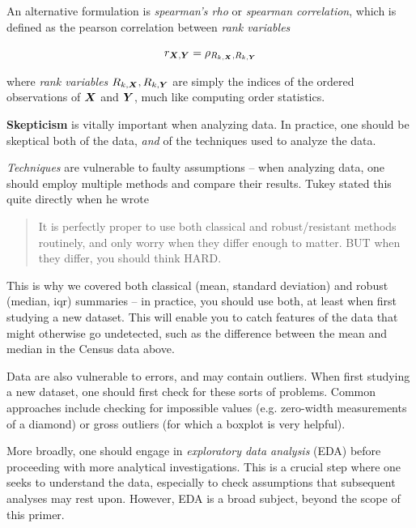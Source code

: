 \documentclass[../primer.tex]{subfiles}
\begin{document}
An alternative formulation is \emph{spearman's rho} or \emph{spearman
  correlation}, which is defined as the pearson correlation between \emph{rank
  variables}

\begin{equation}
  r_{\boldsymbol{X},\boldsymbol{Y}} = \rho_{R_{k,\boldsymbol{X}},R_{k,\boldsymbol{Y}}}
\end{equation}

\noindent where \emph{rank variables} $R_{k,\boldsymbol{X}},R_{k,\boldsymbol{Y}}$ are simply the
indices of the ordered observations of $\boldsymbol{X}$ and $\boldsymbol{Y}$, much like computing
order statistics.\cite{conover1980practical}

\textbf{Skepticism} is vitally important when analyzing data. In practice, one
should be skeptical both of the data, \emph{and} of the techniques used to
analyze the data.

\emph{Techniques} are vulnerable to faulty assumptions -- when analyzing data,
one should employ multiple methods and compare their results.
Tukey\cite{tukey1979robust} stated this quite directly when he wrote

\begin{quote}
It is perfectly proper to use both classical and robust/resistant methods
routinely, and only worry when they differ enough to matter. BUT when they
differ, you should think HARD.
\end{quote}

This is why we covered both classical (mean, standard deviation) and robust
(median, iqr) summaries -- in practice, you should use both, at least when first
studying a new dataset. This will enable you to catch features of the data that
might otherwise go undetected, such as the difference between the mean and
median in the Census data above.

Data are also vulnerable to errors, and may contain outliers. When first
studying a new dataset, one should first check for these sorts of problems.
Common approaches include checking for impossible values (e.g. zero-width
measurements of a diamond) or gross outliers (for which a boxplot is very
helpful).

More broadly, one should engage in \emph{exploratory data analysis} (EDA) before
proceeding with more analytical investigations.\cite{tukey1977eda} This is a
crucial step where one seeks to understand the data, especially to check
assumptions that subsequent analyses may rest upon. However, EDA is a broad
subject, beyond the scope of this primer.
\end{document}
